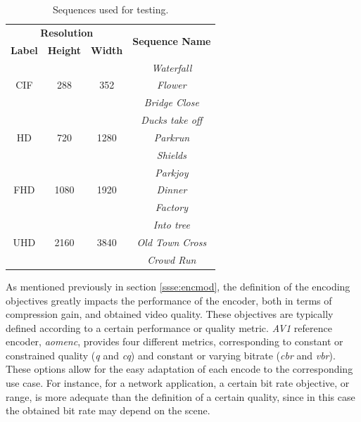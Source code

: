 \begin{table}[!htpb]
    \centering
    \begin{tabular}{cccc} \toprule
        \multicolumn{3}{c}{\textbf{Resolution}}                                 & \multirow{2}{*}{\textbf{Sequence Name}} \\
        \textbf{Label}          & \textbf{Height}       & \textbf{Width}        & \\ \toprule 
        \multirow{3}{*}{CIF}    & \multirow{3}{*}{288}  & \multirow{3}{*}{352}  & \textit{Waterfall}\\
                                &                       &                       & \textit{Flower} \\
                                &                       &                       & \textit{Bridge Close} \\ \hline
        \multirow{3}{*}{HD}     & \multirow{3}{*}{720}  & \multirow{3}{*}{1280} & \textit{Ducks take off}\\
                                &                       &                       & \textit{Parkrun} \\        
                                &                       &                       & \textit{Shields} \\ \hline
        \multirow{3}{*}{FHD}    & \multirow{3}{*}{1080} & \multirow{3}{*}{1920} & \textit{Parkjoy}\\
                                &                       &                       & \textit{Dinner} \\
                                &                       &                       & \textit{Factory} \\ \hline
        \multirow{3}{*}{UHD}    & \multirow{3}{*}{2160} & \multirow{3}{*}{3840} & \textit{Into tree}\\
                                &                       &                       & \textit{Old Town Cross} \\
                                &                       &                       & \textit{Crowd Run} \\ 
        \bottomrule
    \end{tabular}
    \caption{Sequences used for testing.}
    \label{tab:seqs}
\end{table}

As mentioned previously in section \ref{ssse:encmod}, the definition of the encoding objectives greatly impacts the performance of the encoder, both in terms of compression gain, and obtained video quality. These objectives are typically defined according to a certain performance or quality metric. \emph{AV1} reference encoder, \emph{aomenc}, provides four different metrics, corresponding to constant or constrained quality (\emph{q} and \emph{cq}) and constant or varying bitrate (\emph{cbr} and \emph{vbr}). These options allow for the easy adaptation of each encode to the corresponding use case. For instance, for a network application, a certain bit rate objective, or range, is more adequate than the definition of a certain quality, since in this case the obtained bit rate may depend on the scene.

